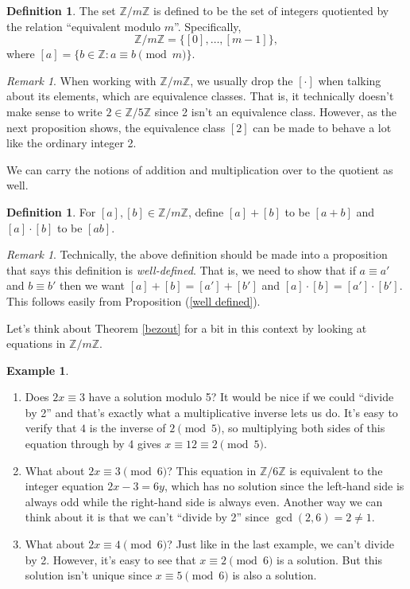 \documentclass[12pt]{article}
\theoremstyle{plain}
\theoremstyle{definition}
\newtheorem{definition}[theorem]{Definition}
\newtheorem{example}[theorem]{Example}
\theoremstyle{remark}
\newtheorem{remark}[theorem]{Remark}
\newcommand{\Z}{\mathbb{Z}}
\begin{document}
\begin{definition}
    The set $\Z/m\Z$ is defined to be the set of integers quotiented by the relation ``equivalent modulo $m$''. Specifically,
    \[
        \Z/m\Z = \{[0], \ldots, [m-1]\},
    \]
    where $[a] = \{b\in \Z: a\equiv b\pmod m\}$.
\end{definition}
\begin{remark}
    When working with $\Z/m\Z$, we usually drop the $[\cdot ]$ when talking about its elements, which are equivalence classes. That is, it technically doesn't make sense to write $2\in \Z/5\Z$ since 2 isn't an equivalence class. However, as the next proposition shows, the equivalence class $[2]$ can be made to behave a lot like the ordinary integer 2.
\end{remark}

We can carry the notions of addition and multiplication over to the quotient as well.

\begin{definition}
    For $[a], [b]\in \Z/m\Z$, define $[a] + [b]$ to be $[a+b]$ and $[a]\cdot [b]$ to be $[ab]$.
\end{definition}

\begin{remark}
    Technically, the above definition should be made into a proposition that says this definition is \emph{well-defined}.
    That is, we need to show that if $a\equiv a'$ and $b\equiv b'$ then we want $[a] + [b] = [a'] + [b']$ and $[a]\cdot [b] = [a']\cdot [b']$.
    This follows easily from Proposition (\ref{well defined}).
\end{remark}

Let's think about Theorem \ref{bezout} for a bit in this context by looking at equations in $\Z/m\Z$.

\begin{example}
    \begin{enumerate}
        \item Does $2x\equiv 3$ have a solution modulo 5?
        It would be nice if we could ``divide by 2'' and that's exactly what a multiplicative inverse lets us do.
        It's easy to verify that $4$ is the inverse of $2\pmod 5$, so multiplying both sides of this equation through by 4 gives $x \equiv 12 \equiv 2\pmod 5$.

        \item What about $2x\equiv 3\pmod 6$?
        This equation in $\Z/6\Z$ is equivalent to the integer equation $2x - 3 = 6y$,
        which has no solution since the left-hand side is always odd while the right-hand side is always even.
        Another way we can think about it is that we can't ``divide by 2'' since $\gcd(2, 6) = 2 \neq 1$.

        \item What about $2x \equiv 4 \pmod 6$?
        Just like in the last example, we can't divide by 2.
        However, it's easy to see that $x \equiv 2\pmod 6$ is a solution.
        But this solution isn't unique since $x \equiv 5 \pmod 6$ is also a solution.
    \end{enumerate}
\end{example}
\end{document}
